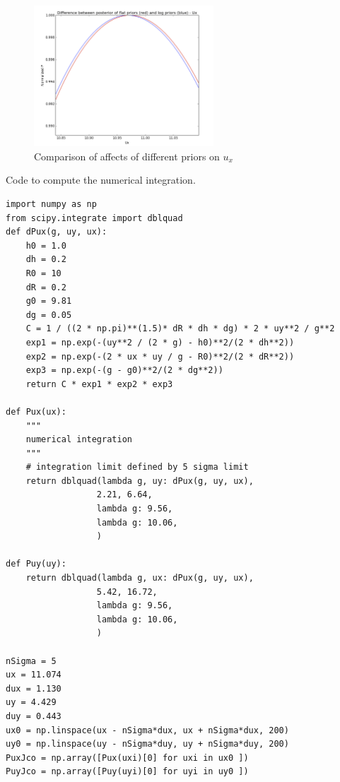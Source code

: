 \documentclass[paper=letter, fontsize=11pt]{scrartcl} %
\begin{document}
\begin{figure}[!ht]
  \centering
  \includegraphics[width=0.6\textwidth]{prior_comp}
  \caption{Comparison of affects of different priors on $u_{x}$}
  \label{fig:Bayesian}
\end{figure}
\appendix{}
Code to compute the numerical integration.
\begin{lstlisting}
import numpy as np
from scipy.integrate import dblquad
def dPux(g, uy, ux):
    h0 = 1.0
    dh = 0.2
    R0 = 10
    dR = 0.2
    g0 = 9.81
    dg = 0.05
    C = 1 / ((2 * np.pi)**(1.5)* dR * dh * dg) * 2 * uy**2 / g**2
    exp1 = np.exp(-(uy**2 / (2 * g) - h0)**2/(2 * dh**2))
    exp2 = np.exp(-(2 * ux * uy / g - R0)**2/(2 * dR**2))
    exp3 = np.exp(-(g - g0)**2/(2 * dg**2))
    return C * exp1 * exp2 * exp3

def Pux(ux):
    """
    numerical integration
    """
    # integration limit defined by 5 sigma limit
    return dblquad(lambda g, uy: dPux(g, uy, ux),
                  2.21, 6.64,
                  lambda g: 9.56,
                  lambda g: 10.06,
                  )

def Puy(uy):
    return dblquad(lambda g, ux: dPux(g, uy, ux),
                  5.42, 16.72,
                  lambda g: 9.56,
                  lambda g: 10.06,
                  )

nSigma = 5
ux = 11.074
dux = 1.130
uy = 4.429
duy = 0.443
ux0 = np.linspace(ux - nSigma*dux, ux + nSigma*dux, 200)
uy0 = np.linspace(uy - nSigma*duy, uy + nSigma*duy, 200)
PuxJco = np.array([Pux(uxi)[0] for uxi in ux0 ])
PuyJco = np.array([Puy(uyi)[0] for uyi in uy0 ])
\end{lstlisting}
\end{document}
